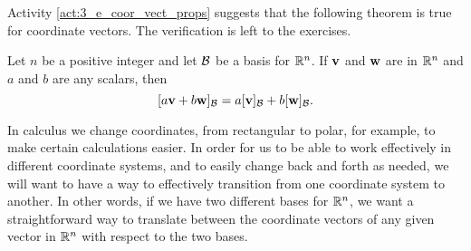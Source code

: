 Activity \ref{act:3_e_coor_vect_props} suggests that the following theorem is true for coordinate vectors. The verification is left to the exercises.

\begin{theorem} \label{thm:3_e_coord_vector} Let $n$ be a positive integer and let $\mathcal{B}$ be a basis for $\mathbb{R}^n$. If $\mathbf{v}$ and $\mathbf{w}$ are in $\mathbb{R}^n$ and $a$ and $b$ are any scalars, then 
\[[a\mathbf{v}+b\mathbf{w}]_{\mathcal{B}} = a[\mathbf{v}]_{\mathcal{B}} + b[\mathbf{w}]_{\mathcal{B}}.\]
\end{theorem} 


\label{sec:cob_rn}

In calculus we change coordinates, from rectangular to polar, for example, to make certain calculations easier. In order for us to be able to work effectively in different coordinate systems, and to easily change back and forth as needed, we will want to have a way to effectively transition from one coordinate system to another. In other words, if we have two different bases for $\mathbb{R}^n$, we want a straightforward way to translate between the coordinate vectors of any given vector in $\mathbb{R}^n$ with respect to the two bases. 


